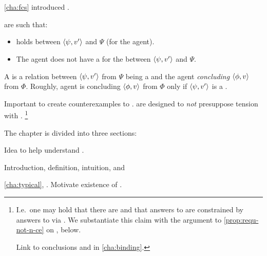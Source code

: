 \chapter{}
\label{cha:requs}

\begin{note}
  \autoref{cha:fcs} introduced .

   are such that:
  \begin{itemize}
  \item
    \ros{} holds between \(\langle \psi, v' \rangle\) and \(\Psi\) (for the agent).
  \item
    The agent does not have a \wit{} for the \ros{} between \(\langle \psi, v' \rangle\) and \(\Psi\).
  \end{itemize}

  A \requ{} is a relation between \(\langle \psi, v' \rangle\) from \(\Psi\) being a \fc{} and the agent \emph{concluding} \(\langle \phi, v \rangle\) from \(\Phi\).
  Roughly, agent is concluding \(\langle \phi, v \rangle\) from \(\Phi\) only if \(\langle \psi, v' \rangle\) is a \fc{}.
\end{note}

\begin{note}
  Important to create counterexamples to \issueConstraint{}.
   are designed to \emph{not} presuppose tension with \issueConstraint{}.%
  \footnote{
    I.e.\ one may hold that there are  and that answers to \qWhyV{} are constrained by answers to \qHowV{} via \issueConstraint{}.
    We substantiate this claim with the argument to \autoref{prop:requ-not-n-ce} on , below.

    Link  to conclusions and \issueConstraint{} in \autoref{cha:binding}.
    }
\end{note}

\begin{note}
  The chapter is divided into three sections:
  \begin{TOCEnum}
  \item

    Idea to help understand .
  \item

    Introduction, definition, intuition, and 
  \item

    \autoref{cha:typical}, \tC{}.
    Motivate existence of .
  \end{TOCEnum}
\end{note}

